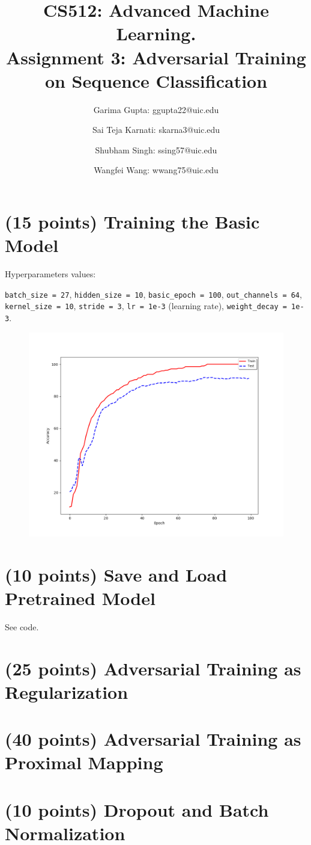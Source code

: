 \documentclass[11pt]{report}
\begin{document}
\title{
  CS512: Advanced Machine Learning. \\
  \large Assignment 3: Adversarial Training on Sequence Classification}

\author{Garima Gupta: ggupta22@uic.edu \and Sai Teja Karnati: skarna3@uic.edu \and
 Shubham Singh: ssing57@uic.edu \and Wangfei Wang: wwang75@uic.edu}

\graphicspath{{../../Figures/}}

\maketitle

\section{(15 points) Training the Basic Model}

Hyperparameters values: 

\texttt{batch\_size = 27}, \texttt{hidden\_size = 10}, \texttt{basic\_epoch = 100}, \texttt{out\_channels = 64}, \texttt{kernel\_size = 10},  \texttt{stride = 3}, \texttt{lr = 1e-3} (learning rate), \texttt{weight\_decay = 1e-3}. 

\begin{figure}[h]
    \includegraphics[width = 15 cm]{BasicModel.png}
    \centering
\end{figure}




\section{(10 points)  Save and Load Pretrained Model}

See code. 

\section{(25 points) Adversarial Training as Regularization}

\section{(40 points) Adversarial Training as Proximal Mapping}

\section{(10 points) Dropout and Batch Normalization}
\end{document}
